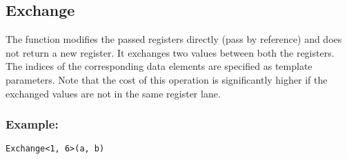 \subsection{Exchange}

The  function modifies the passed registers directly (pass by reference) and does not return a new register.
It exchanges two values between both the registers.
The indices of the corresponding data elements are specified as template parameters.
Note that the cost of this operation is significantly higher if the exchanged values are not in the same register lane. 

\subsubsection*{Example:}
\begin{verbatim}
Exchange<1, 6>(a, b)
\end{verbatim}

